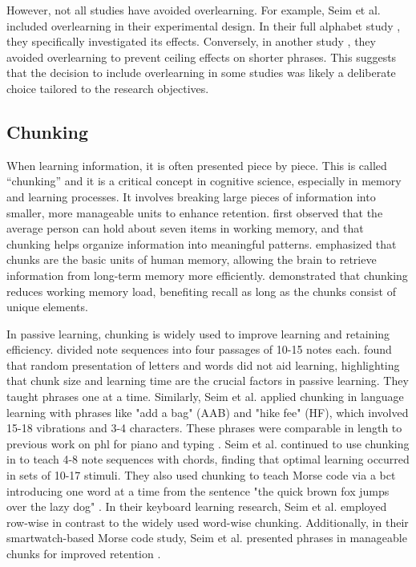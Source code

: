 However, not all studies have avoided overlearning. For example, Seim et al. \cite{Seim2016, Seim2014a} included overlearning in their experimental design. In their full alphabet study \cite{Seim2014a}, they specifically investigated its effects. Conversely, in another study \cite{Seim2015}, they avoided overlearning to prevent ceiling effects on shorter phrases. This suggests that the decision to include overlearning in some studies was likely a deliberate choice tailored to the research objectives.

\subsection*{Chunking}
When learning information, it is often presented piece by piece. This is called \enquote{chunking} and it is a critical concept in cognitive science, especially in memory and learning processes. It involves breaking large pieces of information into smaller, more manageable units to enhance retention.  first observed that the average person can hold about seven items in working memory, and that chunking helps organize information into meaningful patterns.  emphasized that chunks are the basic units of human memory, allowing the brain to retrieve information from long-term memory more efficiently.  demonstrated that chunking reduces working memory load, benefiting recall as long as the chunks consist of unique elements.

In passive learning, chunking is widely used to improve learning and retaining efficiency.  divided note sequences into four passages of 10-15 notes each.  found that random presentation of letters and words did not aid learning, highlighting that chunk size and learning time are the crucial factors in passive learning. They taught phrases one at a time. Similarly, Seim et al. \cite{Seim2014a} applied chunking in language learning with phrases like "add a bag" (AAB) and "hike fee" (HF), which involved 15-18 vibrations and 3-4 characters. These phrases were comparable in length to previous work on \gls{phl} for piano \cite{Kohlsdorf2010} and typing \cite{Seim2014}.
Seim et al. continued to use chunking in \cite{Seim2015} to teach 4-8 note sequences with chords, finding that optimal learning occurred in sets of 10-17 stimuli. They also used chunking to teach Morse code via a \gls{bct} introducing one word at a time from the sentence "the quick brown fox jumps over the lazy dog" \cite{Seim2016}.
In their keyboard learning research, Seim et al. \cite{Seim2017} employed row-wise in contrast to the widely used word-wise chunking. Additionally, in their smartwatch-based Morse code study, Seim et al. presented phrases in manageable chunks for improved retention \cite{Seim2018}.

